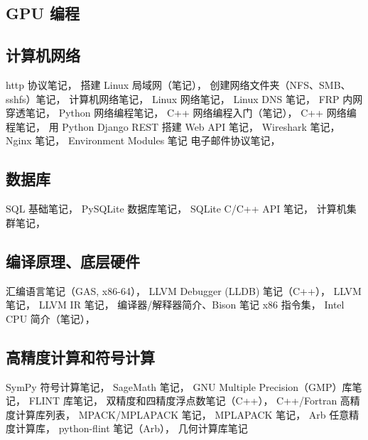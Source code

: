 \subsection{GPU 编程}

\subsection{计算机网络}
http 协议笔记，
搭建 Linux 局域网（笔记），
创建网络文件夹（NFS、SMB、sshfs）笔记，
计算机网络笔记，
Linux 网络笔记，
Linux DNS 笔记，
FRP 内网穿透笔记，
Python 网络编程笔记，
C++ 网络编程入门（笔记），
C++ 网络编程笔记，
用 Python Django REST 搭建 Web API 笔记，
Wireshark 笔记，
Nginx 笔记，
Environment Modules 笔记
电子邮件协议笔记，

\subsection{数据库}
SQL 基础笔记，
PySQLite 数据库笔记，
SQLite C/C++ API 笔记，
计算机集群笔记，

\subsection{编译原理、底层硬件}
汇编语言笔记（GAS, x86-64），
LLVM Debugger (LLDB) 笔记（C++），
LLVM 笔记，
LLVM IR 笔记，
编译器/解释器简介、Bison 笔记
x86 指令集，
Intel CPU 简介（笔记），

\subsection{高精度计算和符号计算}
SymPy 符号计算笔记，
SageMath 笔记，
GNU Multiple Precision（GMP）库笔记，
FLINT 库笔记，
双精度和四精度浮点数笔记（C++），
C++/Fortran 高精度计算库列表，
MPACK/MPLAPACK 笔记，
MPLAPACK 笔记，
Arb 任意精度计算库，
python-flint 笔记（Arb），
几何计算库笔记

